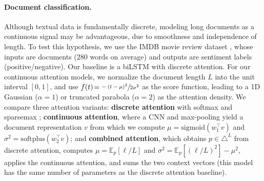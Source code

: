 \documentclass{article}
\begin{document}
\paragraph{Document classification.} 

Although textual data is fundamentally discrete, modeling long documents as a continuous signal may be advantageous, due to smoothness and independence of length. To test this hypothesis, we use the IMDB movie review dataset \citep{maas2011learning}, 
whose inputs are documents (280 words on average) and  outputs are sentiment labels (positive/negative). Our baseline is a biLSTM with discrete attention. 
For our continuous attention models, we normalize the document length $L$ into the unit interval $[0,1]$, and use $f(t)\! =\! \sfrac{-(t-\mu)^2}{2\sigma^2}$ as the score function, leading to a 1D Gaussian ($\alpha=1$) or  truncated parabola ($\alpha=2$) as the attention density.  We compare three attention variants: 
{\bf discrete attention} with softmax \citep{bahdanau2014neural} and sparsemax \citep{Martins2016ICML};  
{\bf continuous attention},  
where a CNN and max-pooling  
yield a document representation $v$ from which 
we compute $\mu = \mathrm{sigmoid}(w_1^\top v)$ and $\sigma^2 = \mathrm{softplus}(w_2^\top v)$;   
and {\bf combined attention}, which obtains $p \in \triangle^L$ from discrete attention, computes $\mu = \mathbb{E}_{p}[\ell/L]$ and $\sigma^2 = \mathbb{E}_{p}[(\ell/L)^2] - \mu^2$, applies the continuous attention, and sums the two context vectors (this model has the same number of parameters as the discrete attention baseline). 
\end{document}
